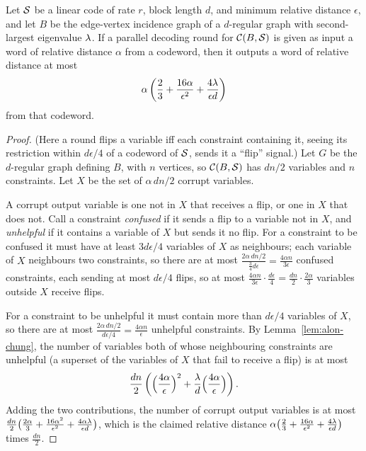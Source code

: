 \begin{lemma}
  \label{lem:round-progress}
  Let $\mathcal{S}$ be a linear code of rate $r$, block length $d$, and minimum relative
  distance $\epsilon$, and let $B$ be the edge-vertex incidence graph of a
  $d$-regular graph with second-largest eigenvalue $\lambda$. If a parallel
  decoding round for $\mathcal{C}(B,\mathcal{S})$ is given as input a word of relative
  distance $\alpha$ from a codeword, then it outputs a word of relative distance
  at most
  \[
    \alpha\left(\frac{2}{3} + \frac{16\alpha}{\epsilon^2}
      + \frac{4\lambda}{\epsilon d}\right)
  \]
  from that codeword.
\end{lemma}
\begin{proof}
  (Here a round flips a variable iff each constraint containing it, seeing its
  restriction within $d\epsilon/4$ of a codeword of $\mathcal{S}$, sends it a ``flip''
  signal.) Let $G$ be the $d$-regular graph defining $B$, with $n$ vertices, so
  $\mathcal{C}(B,\mathcal{S})$ has $dn/2$ variables and $n$ constraints. Let $X$ be the set of
  $\alpha\,dn/2$ corrupt variables.

  A corrupt output variable is one not in $X$ that receives a flip, or one in
  $X$ that does not. Call a constraint \emph{confused} if it sends a flip to a
  variable not in $X$, and \emph{unhelpful} if it contains a variable of $X$ but
  sends it no flip. For a constraint to be confused it must have at least
  $3d\epsilon/4$ variables of $X$ as neighbours; each variable of $X$ neighbours
  two constraints, so there are at most
  $\frac{2\alpha\,dn/2}{\frac34 d\epsilon}=\frac{4\alpha n}{3\epsilon}$ confused
  constraints, each sending at most $d\epsilon/4$ flips, so at most
  $\frac{4\alpha n}{3\epsilon}\cdot\frac{d\epsilon}{4}=\frac{dn}{2}\cdot
  \frac{2\alpha}{3}$ variables outside $X$ receive flips.

  For a constraint to be unhelpful it must contain more than $d\epsilon/4$
  variables of $X$, so there are at most
  $\frac{2\alpha\,dn/2}{d\epsilon/4}=\frac{4\alpha n}{\epsilon}$ unhelpful
  constraints. By Lemma~\ref{lem:alon-chung}, the number of variables both of
  whose neighbouring constraints are unhelpful (a superset of the variables of
  $X$ that fail to receive a flip) is at most
  \[
    \frac{dn}{2}\left(\Bigl(\frac{4\alpha}{\epsilon}\Bigr)^2
      + \frac{\lambda}{d}\Bigl(\frac{4\alpha}{\epsilon}\Bigr)\right).
  \]
  Adding the two contributions, the number of corrupt output variables is at
  most $\frac{dn}{2}\bigl(\frac{2\alpha}{3}
  + \frac{16\alpha^2}{\epsilon^2} + \frac{4\alpha\lambda}{\epsilon d}\bigr)$,
  which is the claimed relative distance $\alpha\bigl(\frac23
  + \frac{16\alpha}{\epsilon^2} + \frac{4\lambda}{\epsilon d}\bigr)$ times
  $\frac{dn}{2}$.
\end{proof}

